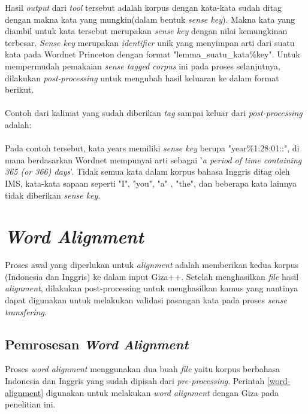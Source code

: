 Hasil \textit{output} dari \textit{tool} tersebut adalah korpus dengan kata-kata sudah ditag dengan makna kata yang mungkin(dalam bentuk \textit{sense key}). Makna kata yang diambil untuk kata tersebut merupakan \textit{sense key} dengan nilai kemungkinan terbesar. \textit{Sense key} merupakan \textit{identifier} unik yang menyimpan arti dari suatu kata pada Wordnet Princeton dengan format "lemma\_suatu\_kata\%key". Untuk mempermudah pemakaian \textit{sense tagged corpus} ini pada proses selanjutnya, dilakukan \textit{post-processing} untuk mengubah hasil keluaran ke dalam format berikut.\\

\noindent{}\\

Contoh dari kalimat yang sudah diberikan \textit{tag} sampai keluar dari \textit{post-processing} adalah:\\

\noindent{}\\

Pada contoh tersebut, kata years memiliki \textit{sense key} berupa "year\%1:28:01::", di mana berdasarkan Wordnet mempunyai arti sebagai '\textit{a period of time containing 365 (or 366) days}'. Tidak semua kata dalam korpus bahasa Inggris ditag oleh IMS, kata-kata sapaan seperti "I", "you", "a" , "the", dan beberapa kata lainnya tidak diberikan \textit{sense key}.  



\section{\textit{Word Alignment}}

Proses awal yang diperlukan untuk \textit{alignment} adalah memberikan kedua korpus (Indonesia dan Inggris) ke dalam input Giza++. Setelah menghasilkan \textit{file} hasil \textit{alignment}, dilakukan post-processing untuk menghasilkan kamus yang nantinya dapat digunakan untuk melakukan validasi pasangan kata pada proses \textit{sense transfering}.

\subsection{Pemrosesan \textit{Word Alignment}}
Proses \textit{word alignment} menggunakan dua buah \textit{file} yaitu korpus berbahasa Indonesia dan Inggris yang sudah dipisah dari \textit{pre-processing}. Perintah \ref{word-alignment} digunakan untuk melakukan \textit{word alignment} dengan Giza pada penelitian ini.

